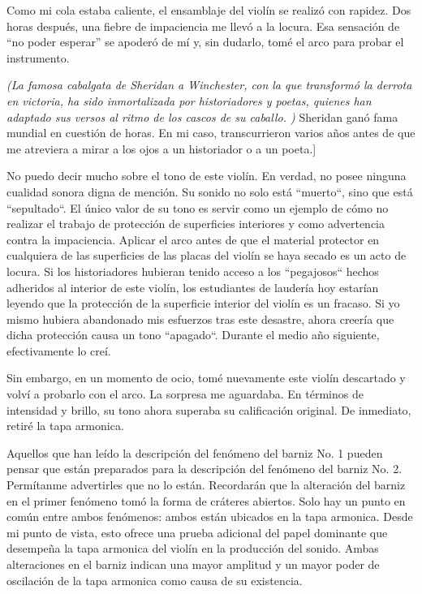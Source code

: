 \documentclass[12pt]{book}
\begin{document}
Como mi cola estaba caliente, el ensamblaje del violín se realizó con rapidez. Dos horas después, una fiebre de impaciencia me llevó a la locura. Esa sensación de ``no poder esperar'' se apoderó de mí y, sin dudarlo, tomé el arco para probar el instrumento.

\textit{(La famosa cabalgata de Sheridan a Winchester, con la que transformó la derrota en victoria, ha sido inmortalizada por historiadores y poetas, quienes han adaptado sus versos al ritmo de los cascos de su caballo. )}  Sheridan ganó fama mundial en cuestión de horas. En mi caso, transcurrieron varios años antes de que me atreviera a mirar a los ojos a un historiador o a un poeta.]

No puedo decir mucho sobre el tono de este violín. En verdad, no posee ninguna cualidad sonora digna de mención. Su sonido no solo está ``muerto``, sino que está ``sepultado``. El único valor de su tono es servir como un ejemplo de cómo no realizar el trabajo de protección de superficies interiores y como advertencia contra la impaciencia. Aplicar el arco antes de que el material protector en cualquiera de las superficies de las placas del violín se haya secado es un acto de locura. Si los historiadores hubieran tenido acceso a los ``pegajosos`` hechos adheridos al interior de este violín, los estudiantes de laudería hoy estarían leyendo que la protección de la superficie interior del violín es un fracaso. Si yo mismo hubiera abandonado mis esfuerzos tras este desastre, ahora creería que dicha protección causa un tono ``apagado``. Durante el medio año siguiente, efectivamente lo creí.

Sin embargo, en un momento de ocio, tomé nuevamente este violín descartado y volví a probarlo con el arco. La sorpresa me aguardaba. En términos de intensidad y brillo, su tono ahora superaba su calificación original. De inmediato, retiré la tapa armonica.

Aquellos que han leído la descripción del fenómeno del barniz No. 1 pueden pensar que están preparados para la descripción del fenómeno del barniz No. 2. Permítanme advertirles que no lo están. Recordarán que la alteración del barniz en el primer fenómeno tomó la forma de cráteres abiertos. Solo hay un punto en común entre ambos fenómenos: ambos están ubicados en la tapa armonica. Desde mi punto de vista, esto ofrece una prueba adicional del papel dominante que desempeña la tapa armonica del violín en la producción del sonido. Ambas alteraciones en el barniz indican una mayor amplitud y un mayor poder de oscilación de la tapa armonica como causa de su existencia.
\end{document}
